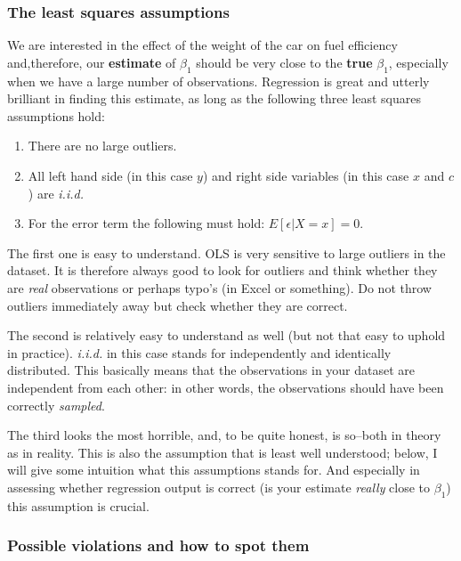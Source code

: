 \documentclass[]{article}
\providecommand{\tightlist}{%
  \setlength{\itemsep}{0pt}\setlength{\parskip}{0pt}}
\theoremstyle{definition}
\theoremstyle{definition}
\theoremstyle{definition}
\theoremstyle{remark}
\begin{document}
\subsubsection{The least squares
assumptions}\label{the-least-squares-assumptions}

We are interested in the effect of the weight of the car on fuel
efficiency and,therefore, our \textbf{estimate} of \(\beta_1\) should be
very close to the \textbf{true} \(\beta_1\), especially when we have a
large number of observations. Regression is great and utterly brilliant
in finding this estimate, as long as the following three least squares
assumptions hold:

\begin{enumerate}
\def\labelenumi{\arabic{enumi}.}
\tightlist
\item
  There are no large outliers.
\item
  All left hand side (in this case \(y\)) and right side variables (in
  this case \(x\) and \(c\)) are \emph{i.i.d.}
\item
  For the error term the following must hold: \(E[\epsilon|X=x] = 0\).
\end{enumerate}

The first one is easy to understand. OLS is very sensitive to large
outliers in the dataset. It is therefore always good to look for
outliers and think whether they are \emph{real} observations or perhaps
typo's (in Excel or something). Do not throw outliers immediately away
but check whether they are correct.

The second is relatively easy to understand as well (but not that easy
to uphold in practice). \emph{i.i.d.} in this case stands for
independently and identically distributed. This basically means that the
observations in your dataset are independent from each other: in other
words, the observations should have been correctly \emph{sampled}.

The third looks the most horrible, and, to be quite honest, is so--both
in theory as in reality. This is also the assumption that is least well
understood; below, I will give some intuition what this assumptions
stands for. And especially in assessing whether regression output is
correct (is your estimate \emph{really} close to \(\beta_1\)) this
assumption is crucial.

\subsubsection{Possible violations and how to spot
them}\label{possible-violations-and-how-to-spot-them}
\end{document}
